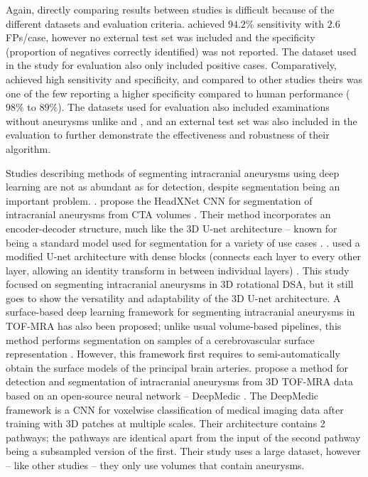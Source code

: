 Again, directly comparing results between studies is difficult because of the different datasets and evaluation criteria. \citeauthor{Nakao2018} achieved $94.2\%$ sensitivity with $2.6$ FPs/case, however no external test set was included and the specificity (proportion of negatives correctly identified) was not reported. The dataset used in the study for evaluation also only included positive cases. Comparatively, \citeauthor{Joo2020} achieved high sensitivity and specificity, and compared to other studies theirs was one of the few reporting a higher specificity compared to human performance ($98\%$ to $89\%$). The datasets used for evaluation also included examinations without aneurysms unlike \citeauthor{Ueda2019} and \citeauthor{Nakao2018}, and an external test set was also included in the evaluation to further demonstrate the effectiveness and robustness of their algorithm.

Studies describing methods of segmenting intracranial aneurysms using deep learning are not as abundant as for detection, despite segmentation being an important problem. . \citeauthor{Park2019} propose the HeadXNet CNN for segmentation of intracranial aneurysms from CTA volumes \cite{Park2019}. Their method incorporates an encoder-decoder structure, much like the 3D U-net architecture -- known for being a standard model used for segmentation for a variety of use cases \cite{3dunet}. . \citeauthor{Liu2021} used a modified U-net architecture with dense blocks (connects each layer to every other layer, allowing an identity transform in between individual layers) \cite{Liu2021}. This study focused on segmenting intracranial aneurysms in 3D rotational DSA, but it still goes to show the versatility and adaptability  of the 3D U-net architecture. A surface-based deep learning framework for segmenting intracranial aneurysms in TOF-MRA has also been proposed; unlike usual volume-based pipelines, this method performs segmentation on samples of a cerebrovascular surface representation \cite{Yang2020}. However, this framework first requires to semi-automatically obtain the surface models of the principal brain arteries. \citeauthor{Sichermann2019} propose a method for detection and segmentation of intracranial aneurysms from 3D TOF-MRA data based on an open-source neural network --  DeepMedic \cite{Sichermann2019}. The DeepMedic framework is a CNN for voxelwise classification of medical imaging data after training with 3D patches at multiple scales. Their architecture contains 2 pathways; the pathways are identical apart from the input of the second pathway being a subsampled version of the first. Their study uses a large dataset, however -- like other studies -- they only use volumes that contain aneurysms. 

